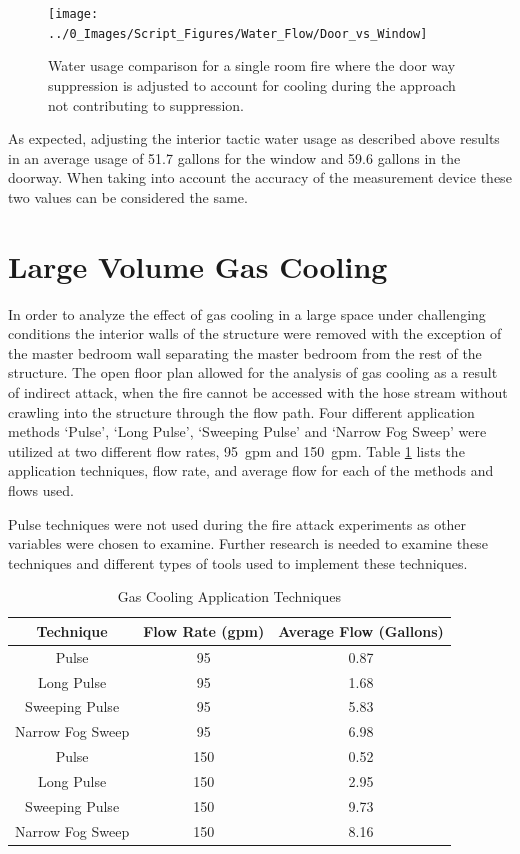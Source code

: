 \documentclass[12pt,oneside]{book}
\begin{document}
\begin{figure}[H]
\centering
\texttt{[image: ../0\_Images/Script\_Figures/Water\_Flow/Door\_vs\_Window]}
\caption[Water Usage For Single Room]{Water usage comparison for a single room fire where the door way suppression is adjusted to account for cooling during the approach not contributing to suppression.}
\label{fig:Door_vs_window}
\end{figure}

As expected, adjusting the interior tactic water usage as described above results in an average usage of 51.7 gallons for the window and 59.6 gallons in the doorway. When taking into account the accuracy of the measurement device these two values can be considered the same.  

\section{Large Volume Gas Cooling}
In order to analyze the effect of gas cooling in a large space under challenging conditions the interior walls of the structure were removed with the exception of the master bedroom wall separating the master bedroom from the rest of the structure. The open floor plan allowed for the analysis of gas cooling as a result of indirect attack, when the fire cannot be accessed with the hose stream without crawling into the structure through the flow path. Four different application methods `Pulse', `Long Pulse', `Sweeping Pulse' and `Narrow Fog Sweep' were utilized at two different flow rates, 95~gpm and 150~gpm. Table \ref{tab:Gas_Cooling_Techniques} lists the application techniques, flow rate, and average flow for each of the methods and flows used. 

Pulse techniques were not used during the fire attack experiments as other variables were chosen to examine.  Further research is needed to examine these techniques and different types of tools used to implement these techniques.

\begin{table}[H]
\centering
\caption{Gas Cooling Application Techniques}
\begin{tabular}{|c|c|c|}
\hline
Technique & Flow Rate (gpm) & Average Flow (Gallons)\\ \hline \hline
Pulse & 95 & 0.87 \\ \hline
Long Pulse & 95 & 1.68 \\ \hline
Sweeping Pulse & 95 & 5.83 \\ \hline
Narrow Fog Sweep & 95 & 6.98 \\ \hline
Pulse & 150 & 0.52 \\ \hline
Long Pulse & 150 & 2.95 \\ \hline
Sweeping Pulse & 150 & 9.73 \\ \hline
Narrow Fog Sweep & 150 & 8.16 \\ \hline
\end{tabular}
\label{tab:Gas_Cooling_Techniques}
\end{table}
\end{document}
